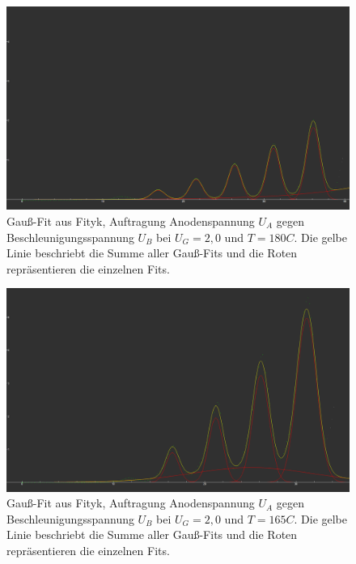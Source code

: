 \documentclass{article}
\begin{document}
\begin{figure}[H]
  \centering
  \includegraphics[scale=0.2]{FH_2,7V_180C.png}
  \caption{Gauß-Fit aus Fityk, Auftragung Anodenspannung $U_A$ gegen Beschleunigungsspannung $U_B$ bei $U_G=2,0$ und $T=180C$. Die gelbe
  Linie beschriebt die Summe aller Gauß-Fits und die Roten repräsentieren die einzelnen Fits.}
  \label{FH 2,0V_180C}
\end{figure}

\begin{figure}[H]
  \centering
  \includegraphics[scale=0.2]{FH_2,0V_165C.png}
  \caption{Gauß-Fit aus Fityk, Auftragung Anodenspannung $U_A$ gegen Beschleunigungsspannung $U_B$ bei $U_G=2,0$ und $T=165C$. Die gelbe
  Linie beschriebt die Summe aller Gauß-Fits und die Roten repräsentieren die einzelnen Fits.}
  \label{FH 2,7V_165C}
\end{figure}
\end{document}
